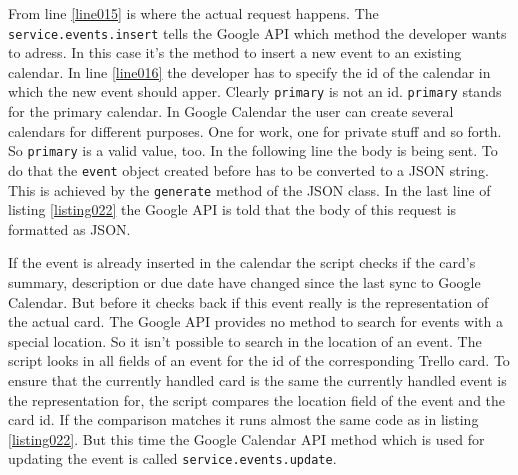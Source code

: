 From line \ref{line015} is where the actual request happens. The \lstinline{service.events.insert} tells the Google API which method the developer wants to adress. \cite{google:calapi} In this case it's the method to insert a new event to an existing calendar. In line \ref{line016} the developer has to specify the id of the calendar in which the new event should apper. Clearly \texttt{primary} is not an id. \texttt{primary} stands for the primary calendar. In Google Calendar the user can create several calendars for different purposes. One for work, one for private stuff and so forth. So \texttt{primary} is a valid value, too. In the following line the body is being sent. To do that the \lstinline{event} object created before has to be converted to a JSON string. This is achieved by the \lstinline{generate} method of the JSON class. \cite{json:docu} In the last line of listing \ref{listing022} the Google API is told that the body of this request is formatted as JSON.

If the event is already inserted in the calendar the script checks if the card's summary, description or due date have changed since the last sync to Google Calendar. But before it checks back if this event really is the representation of the actual card. The Google API provides no method to search for events with a special location. So it isn't possible to search in the location of an event. The script looks in all fields of an event for the id of the corresponding Trello card. To ensure that the currently handled card is the same the currently handled event is the representation for, the script compares the location field of the event and the card id. If the comparison matches it runs almost the same code as in listing \ref{listing022}. But this time the Google Calendar API method which is used for updating the event is called \lstinline{service.events.update}. 

